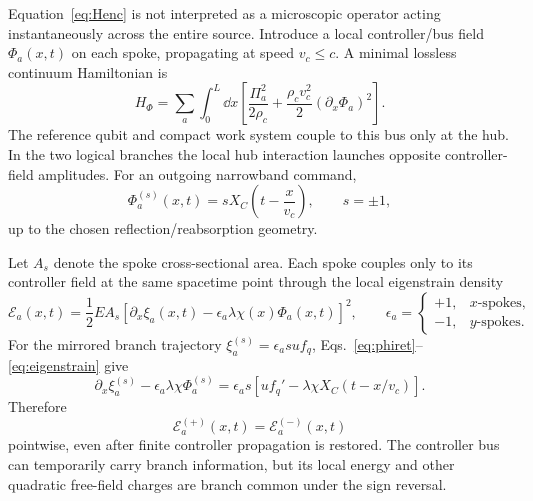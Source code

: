 Equation~\eqref{eq:Henc} is not interpreted as a microscopic operator acting instantaneously across the entire source. Introduce a local controller/bus field $\Phi_a(x,t)$ on each spoke, propagating at speed $v_c\le c$. A minimal lossless continuum Hamiltonian is
\begin{equation}
\boxed{
H_{\Phi}
=\sum_a\int_0^L\dd x
\left[
\frac{\Pi_a^2}{2\rho_c}
+\frac{\rho_cv_c^2}{2}(\partial_x\Phi_a)^2
\right].}
\label{eq:Hphi}
\end{equation}
The reference qubit and compact work system couple to this bus only at the hub. In the two logical branches the local hub interaction launches opposite controller-field amplitudes. For an outgoing narrowband command,
\begin{equation}
\boxed{
\Phi_a^{(s)}(x,t)
=sX_C\!\left(t-\frac{x}{v_c}\right),
\qquad s=\pm1,}
\label{eq:phiret}
\end{equation}
up to the chosen reflection/reabsorption geometry.

Let $A_s$ denote the spoke cross-sectional area. Each spoke couples only to its controller field at the same spacetime point through the local eigenstrain density
\begin{equation}
\boxed{
\mathcal E_a(x,t)
=\frac12E A_s
\left[
\partial_x\xi_a(x,t)
-\epsilon_a\lambda\chi(x)\Phi_a(x,t)
\right]^2,}
\qquad
\epsilon_a=\begin{cases}+1,&x\text{-spokes},\\-1,&y\text{-spokes}.
\end{cases}
\label{eq:eigenstrain}
\end{equation}
For the mirrored branch trajectory $\xi_a^{(s)}=\epsilon_a s u f_q$, Eqs.~\eqref{eq:phiret}--\eqref{eq:eigenstrain} give
\begin{equation}
\partial_x\xi_a^{(s)}-
\epsilon_a\lambda\chi\Phi_a^{(s)}
=
\epsilon_as
\left[u f_q'-\lambda\chi X_C(t-x/v_c)\right].
\end{equation}
Therefore
\begin{equation}
\boxed{
\mathcal E_a^{(+)}(x,t)
=\mathcal E_a^{(-)}(x,t)}
\label{eq:pointwiseenergy}
\end{equation}
pointwise, even after finite controller propagation is restored. The controller bus can temporarily carry branch information, but its local energy and other quadratic free-field charges are branch common under the sign reversal.

